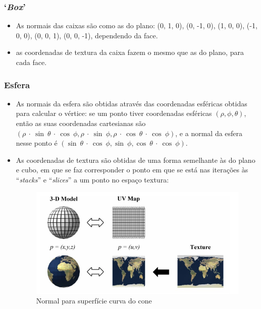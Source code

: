\documentclass[11pt,a4paper]{report}%
\begin{document}
\subsubsection{`\textit{Box}'}
\begin{itemize}
\item As normais das caixas são como as do plano: (0, 1, 0), (0, -1, 0),
(1, 0, 0), (-1, 0, 0), (0, 0, 1), (0, 0, -1), dependendo da face.
\item as coordenadas de textura da caixa fazem o mesmo que as do plano, para cada face.
\end{itemize}

\subsubsection{Esfera}
\begin{itemize}
  \item As normais da esfera são obtidas através das coordenadas esféricas obtidas para calcular o
  vértice: se um ponto tiver coordenadas esféricas $(\rho, \phi, \theta)$, então as suas coordenadas cartesianas
  são $(\rho \ \cdot \ \sin \ \theta \ \cdot \ \cos \ \phi, \rho \ \cdot \ \sin \ \phi, \rho \ \cdot \ \cos \ \theta \ \cdot \ \cos \ \phi)$,
  e a normal da esfera nesse ponto é $(\sin \ \theta \ \cdot \ \cos \ \phi, \sin \ \phi, \cos \ \theta \ \cdot \ \cos \ \phi)$.

  \item As coordenadas de textura são obtidas de uma forma semelhante às do plano e cubo, em que se
  faz corresponder o ponto em que se está nas iterações às ``\textit{stacks}'' e ``\textit{slices}'' a um ponto no espaço textura:

  \begin{figure}[H]
    \centering
    \includegraphics[scale=1]{sphere_uv_map.jpg}
    \caption{Normal para superfície curva do cone}
    \label{fig:sphere_uv_map}
  \end{figure}


\end{itemize}
\end{document}
